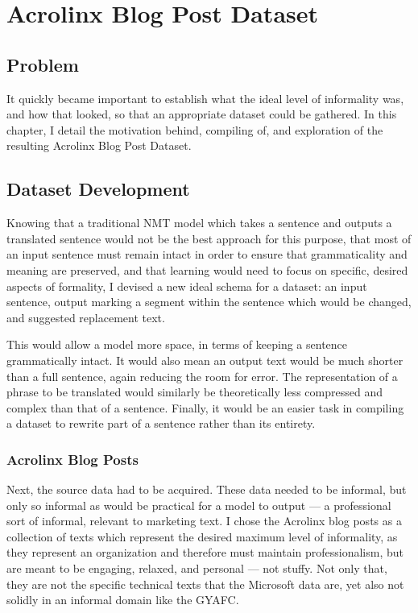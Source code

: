 \chapter{Acrolinx Blog Post Dataset}

\label{Chapter04}

\section{Problem}

It quickly became important to establish what the ideal level of informality was, and how that looked, so that an appropriate dataset could be gathered. In this chapter, I detail the motivation behind, compiling of, and exploration of the resulting Acrolinx Blog Post Dataset.

\section{Dataset Development}

Knowing that a traditional NMT model which takes a sentence and outputs a translated sentence would not be the best approach for this purpose, that most of an input sentence must remain intact in order to ensure that grammaticality and meaning are preserved, and that learning would need to focus on specific, desired aspects of formality, I devised a new ideal schema for a dataset: an input sentence, output marking a segment within the sentence which would be changed, and suggested replacement text.

This would allow a model more space, in terms of keeping a sentence grammatically intact. It would also mean an output text would be much shorter than a full sentence, again reducing the room for error. The representation of a phrase to be translated would similarly be theoretically less compressed and complex than that of a sentence. Finally, it would be an easier task in compiling a dataset to rewrite part of a sentence rather than its entirety.

\subsection{Acrolinx Blog Posts}

Next, the source data had to be acquired. These data needed to be informal, but only so informal as would be practical for a model to output --- a professional sort of informal, relevant to marketing text. I chose the Acrolinx blog posts as a collection of texts which represent the desired maximum level of informality, as they represent an organization and therefore must maintain professionalism, but are meant to be engaging, relaxed, and personal --- not stuffy. Not only that, they are not the specific technical texts that the Microsoft data are, yet also not solidly in an informal domain like the GYAFC.

